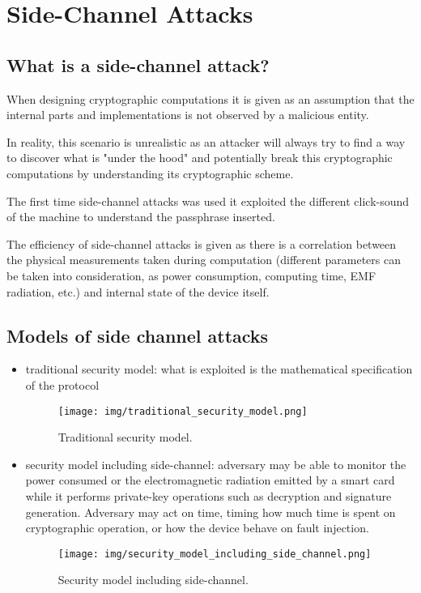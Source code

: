 \section{Side-Channel Attacks}

\subsection{What is a side-channel attack?}

When designing cryptographic computations it is given as an assumption that the internal parts and implementations is not observed by a malicious entity.

In reality, this scenario is unrealistic as an attacker will always try to find a way to discover what is "under the hood" and potentially break this cryptographic computations by understanding its cryptographic scheme. 

The first time side-channel attacks was used it exploited the different click-sound of the machine to understand the passphrase inserted. 

The efficiency of side-channel attacks is given as there is a correlation between the physical measurements taken during computation (different parameters can be taken into consideration, as power consumption, computing time, EMF radiation, etc.) and internal state of the device itself. 

\subsection{Models of side channel attacks}

\begin{itemize}
    \item traditional security model: what is exploited is the mathematical specification of the protocol
    \begin{figure}
        \centering
        \texttt{[image: img/traditional\_security\_model.png]}
        \caption{Traditional security model.}
        \label{fig:tra_sec_mod}
    \end{figure}
    \item security model including side-channel: adversary may be able to monitor the power consumed or the electromagnetic
    radiation emitted by a smart card while it performs private-key operations such as
    decryption and signature generation. \newline
    Adversary may act on time, timing how much time is spent on cryptographic operation, or how the device behave on fault injection.  
    \begin{figure}
        \centering
        \texttt{[image: img/security\_model\_including\_side\_channel.png]}
        \caption{Security model including side-channel.}
        \label{fig:sec_mod_inc_side_channels}
    \end{figure}
    
\end{itemize}

